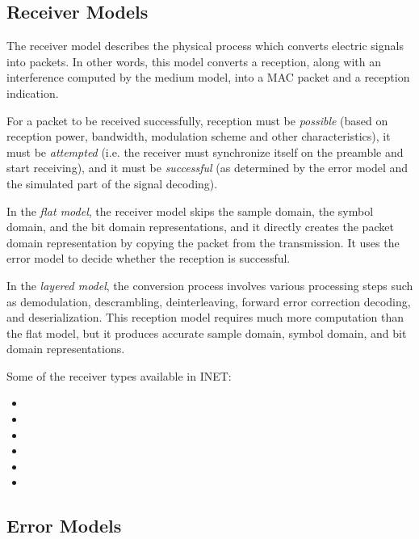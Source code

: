 \subsection{Receiver Models}
\label{sec:phy:receiver-models}

The receiver model describes the physical process which converts electric
signals into packets. In other words, this model converts a reception, along
with an interference computed by the medium model, into a MAC packet and a
reception indication.

For a packet to be received successfully, reception must be \textit{possible}
(based on reception power, bandwidth, modulation scheme and other characteristics),
it must be \textit{attempted} (i.e. the receiver must synchronize itself on
the preamble and start receiving), and it must be \textit{successful}
(as determined by the error model and the simulated part of the signal decoding).

In the \textit{flat model}, the receiver model skips the sample domain, the symbol domain,
and the bit domain representations, and it directly creates the packet domain
representation by copying the packet from the transmission. It uses the error
model to decide whether the reception is successful.

In the \textit{layered model}, the conversion process involves various processing steps
such as demodulation, descrambling, deinterleaving, forward error correction
decoding, and deserialization. This reception model requires much more
computation than the flat model, but it produces accurate sample domain,
symbol domain, and bit domain representations.

Some of the receiver types available in INET:

\begin{itemize}
  \item {}
  \item {}
  \item {}
  \item {}
  \item {}
  \item {}
\end{itemize}


\subsection{Error Models}
\label{sec:phy:error-models}


